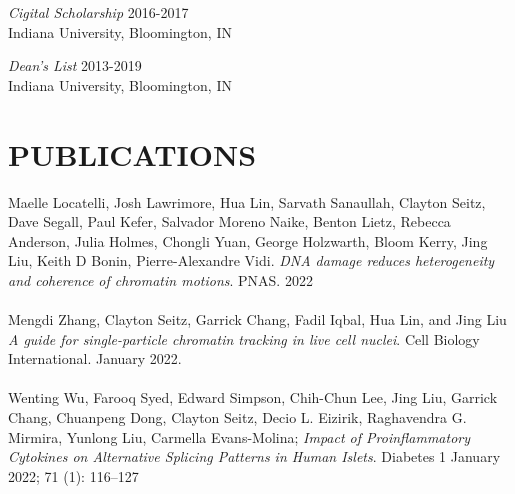 \documentclass[margin, 10pt]{res} %
\begin{document}
\begin{resume}
{\sl Cigital Scholarship} \hfill 2016-2017 \\
Indiana University, Bloomington, IN 

{\sl Dean’s List} \hfill 2013-2019 \\
Indiana University, Bloomington, IN 

\section{PUBLICATIONS}

Maelle Locatelli\textsuperscript{\textdagger}, Josh Lawrimore\textsuperscript{\textdagger}, Hua Lin\textsuperscript{\textdagger}, Sarvath Sanaullah, Clayton Seitz, Dave Segall, Paul Kefer, Salvador Moreno Naike, Benton Lietz, Rebecca Anderson, Julia Holmes, Chongli Yuan, George Holzwarth, Bloom Kerry, Jing Liu, Keith D Bonin, Pierre-Alexandre Vidi. \textit{DNA damage reduces heterogeneity and coherence of chromatin motions}. PNAS. 2022
\\
\\
Mengdi Zhang, Clayton Seitz, Garrick Chang, Fadil Iqbal, Hua Lin, and Jing Liu \textit{A guide for single-particle chromatin tracking in live cell nuclei}. Cell Biology International. January 2022.
\\
\\
Wenting Wu, Farooq Syed, Edward Simpson, Chih-Chun Lee, Jing Liu, Garrick Chang, Chuanpeng Dong, Clayton Seitz, Decio L. Eizirik, Raghavendra G. Mirmira, Yunlong Liu, Carmella Evans-Molina; \textit{Impact of Proinflammatory Cytokines on Alternative Splicing Patterns in Human Islets}. Diabetes 1 January 2022; 71 (1): 116–127


\end{resume}
\end{document}
